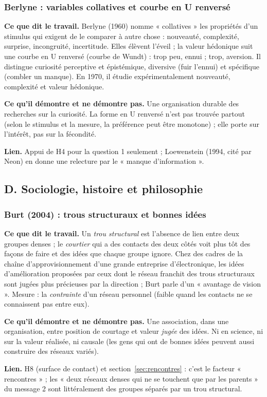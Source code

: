 \documentclass[a4paper,11pt]{article}
\newcommand{\cours}[1]{\par\smallskip\textbf{\textsf{#1}}\enspace}
\begin{document}
\subsubsection{Berlyne : variables collatives et courbe en U renversé}
\cours{Ce que dit le travail.} Berlyne (1960) nomme « collatives » les propriétés d'un stimulus qui exigent de le comparer à autre chose : nouveauté, complexité, surprise, incongruité, incertitude. Elles élèvent l'éveil ; la valeur hédonique suit une courbe en U renversé (courbe de Wundt) : trop peu, ennui ; trop, aversion. Il distingue curiosité perceptive et épistémique, diversive (fuir l'ennui) et spécifique (combler un manque). En 1970, il étudie expérimentalement nouveauté, complexité et valeur hédonique.
\cours{Ce qu'il démontre et ne démontre pas.} Une organisation durable des recherches sur la curiosité. La forme en U renversé n'est pas trouvée partout (selon le stimulus et la mesure, la préférence peut être monotone) ; elle porte sur l'intérêt, pas sur la fécondité.
\cours{Lien.} Appui de H4 pour la question 1 seulement ; Loewenstein (1994, cité par Neon) en donne une relecture par le « manque d'information ».

\subsection*{D. Sociologie, histoire et philosophie}

\subsubsection{Burt (2004) : trous structuraux et bonnes idées}
\cours{Ce que dit le travail.} Un \emph{trou structural} est l'absence de lien entre deux groupes denses ; le \emph{courtier} qui a des contacts des deux côtés voit plus tôt des façons de faire et des idées que chaque groupe ignore. Chez des cadres de la chaîne d'approvisionnement d'une grande entreprise d'électronique, les idées d'amélioration proposées par ceux dont le réseau franchit des trous structuraux sont jugées plus précieuses par la direction ; Burt parle d'un « avantage de vision ». Mesure : la \emph{contrainte} d'un réseau personnel (faible quand les contacts ne se connaissent pas entre eux).
\cours{Ce qu'il démontre et ne démontre pas.} Une association, dans une organisation, entre position de courtage et valeur \emph{jugée} des idées. Ni en science, ni sur la valeur réalisée, ni causale (les gens qui ont de bonnes idées peuvent aussi construire des réseaux variés).
\cours{Lien.} H8 (surface de contact) et section~\ref{sec:rencontres} : c'est le facteur « rencontres » ; les « deux réseaux denses qui ne se touchent que par les parents » du message 2 sont littéralement des groupes séparés par un trou structural.
\end{document}
